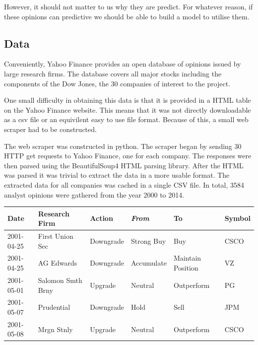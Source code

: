 \documentclass{report}
\begin{document}
However, it should not matter to us why they are predict. For whatever reason, if these opinions can predictive we should be able to build a model to utilise them.

\subsection{Data}

Conveniently, Yahoo Finance provides an open database of opinions issued by large research firms. The database covers all major stocks including the components of the Dow Jones, the 30 companies of interest to the project. 

One small difficulty in obtaining this data is that it is provided in a HTML table on the Yahoo Finance website. This means that it was not directly downloadable as a csv file or an equivilent easy to use file format. Because of this, a small web scraper had to be constructed. 

The web scraper was constructed in python. The scraper began by sending 30 HTTP get requests to Yahoo Finance, one for each company. The responses were then parsed using the BeautifulSoup4 HTML parsing library. After the HTML was parsed it was trivial to extract the data in a more usable format. The extracted data for all companies was cached in a single CSV file. In total, 3584 analyst opinions were gathered from the year 2000 to 2014.

\begin{center}
  
  \begin{tabular}{l | l | l | l | l | l}
\textbf{Date}        & \textbf{Research Firm}      & \textbf{Action}       & \textit{From}         & \textbf{To}                   & \textbf{Symbol} \\ \hline
2001-04-25  & First Union Sec    & Downgrade    & Strong Buy   & Buy                  & CSCO \\ \hline
2001-04-25  & AG Edwards         & Downgrade    & Accumulate   & Maintain Position    & VZ \\ \hline
2001-05-01  & Salomon Smth Brny  & Upgrade      & Neutral      & Outperform           & PG \\ \hline
2001-05-07  & Prudential         & Downgrade    & Hold         & Sell                 & JPM \\ \hline
2001-05-08  & Mrgn Stnly         & Upgrade      & Neutral      & Outperform           & CSCO
	  \label{table:opinions-data}
  \end{tabular}
\end{center}
\end{document}
